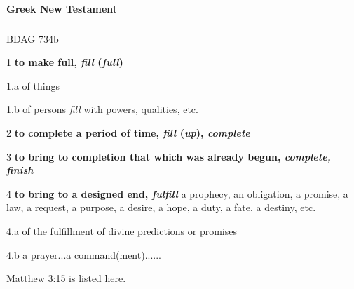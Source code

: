			
		\paragraph{Greek New Testament} %
			\label{FULNESS-GREEK}
			
			\subparagraph{\texorpdfstring{}{}}
				\label{PLEROO}
			
				\begin{compactdesc}
					\item[BDAG 734b] \textbf{}
						\begin{compactitem}
							\item[1] \textbf{to make full, \textit{fill} (\textit{full})}
							\item[1.a] of things
							\item[1.b] of persons \textit{fill} with powers, qualities, etc.
							\item[2] \textbf{to complete a period of time, \textit{fill} (\textit{up}), \textit{complete}}
							\item[3] \textbf{to bring to completion that which was already begun, \textit{complete, finish}}
							\item[4] \textbf{to bring to a designed end, \textit{fulfill}} a prophecy, an obligation, a promise, a law, a request, a purpose, a desire, a hope, a duty, a fate, a destiny, etc.
							\item[4.a] of the fulfillment of divine predictions or promises
							\item[4.b] a prayer...a command(ment)......
								\begin{compactitem}
									\item \hyperref[MATTHEW-3-15]{Matthew 3:15} is listed here.
								\end{compactitem}
						\end{compactitem}
				\end{compactdesc}
				
